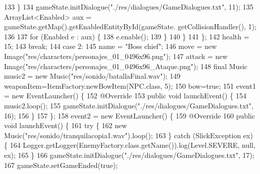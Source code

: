 \begin{DoxyCode}
133                             \}
134                             gameState.initDialogue(\textcolor{stringliteral}{"./res/dialogues/GameDialogues.txt"}, 11);
135                             ArrayList<Enabled> aux = gameState.getMap().getEnabledEntityById(gameState.
      getCollisionHandler(), 1);
136 
137                             \textcolor{keywordflow}{for} (Enabled e : aux) \{
138                                 e.enable();
139                             \}
140                         \}
141                     \};
142                     health = 15;
143                     \textcolor{keywordflow}{break};
144                 \textcolor{keywordflow}{case} 2:
145                     name = \textcolor{stringliteral}{"Boss chief"};
146                     move = \textcolor{keyword}{new} Image(\textcolor{stringliteral}{"res/characters/personajes\_01\_0496x96.png"});
147                     attack = \textcolor{keyword}{new} Image(\textcolor{stringliteral}{"res/characters/personajes\_01\_0496x96\_Ataque.png"});
148                     \textcolor{keyword}{final} Music music2 = \textcolor{keyword}{new} Music(\textcolor{stringliteral}{"res/sonido/batallaFinal.wav"});
149                     weaponItem=ItemFactory.newBowItem(NPC.class, 5);
150                     bow=\textcolor{keyword}{true};
151                     event1 = \textcolor{keyword}{new} EventLauncher() \{
152                         @Override
153                         \textcolor{keyword}{public} \textcolor{keywordtype}{void} launchEvent() \{
154                             music2.loop();
155                             gameState.initDialogue(\textcolor{stringliteral}{"./res/dialogues/GameDialogues.txt"}, 16);
156                         \}
157                     \};
158                     event2 = \textcolor{keyword}{new} EventLauncher() \{
159                         @Override
160                         \textcolor{keyword}{public} \textcolor{keywordtype}{void} launchEvent() \{
161                             \textcolor{keywordflow}{try} \{
162                                 \textcolor{keyword}{new} Music(\textcolor{stringliteral}{"res/sonido/tranquilacopia1.wav"}).loop();
163                             \} \textcolor{keywordflow}{catch} (SlickException ex) \{
164                                 Logger.getLogger(EnemyFactory.class.getName()).log(Level.SEVERE, null, ex);
165                             \}
166                             gameState.initDialogue(\textcolor{stringliteral}{"./res/dialogues/GameDialogues.txt"}, 17);
167                             gameState.setGameEnded(\textcolor{keyword}{true});

\end{DoxyCode}

